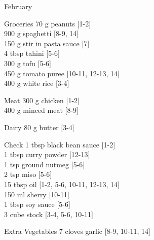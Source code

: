\begin{menu}{February}
\begin{shoppinglist}{Groceries}
      70 g peanuts 
        {\scriptsize[1-2]}\\
      900 g spaghetti 
        {\scriptsize[8-9, 14]}\\
      150 g stir in pasta sauce 
        {\scriptsize[7]}\\
      4 tbsp tahini 
        {\scriptsize[5-6]}\\
      300 g tofu 
        {\scriptsize[5-6]}\\
      450 g tomato puree 
        {\scriptsize[10-11, 12-13, 14]}\\
      400 g white rice 
        {\scriptsize[3-4]}\\
      \end{shoppinglist}%
      \par\vfil %
      \begin{shoppinglist}{Meat}
      300 g chicken 
        {\scriptsize[1-2]}\\
      400 g minced meat 
        {\scriptsize[8-9]}\\
      \end{shoppinglist}%
      \begin{shoppinglist}{Dairy}
      80 g butter 
        {\scriptsize[3-4]}\\
      \end{shoppinglist}%
      \par\vfil %
      \vfil\clearpage %
      \begin{shoppinglist}{Check}
      1 tbsp black bean sauce 
        {\scriptsize[1-2]}\\
      1 tbsp curry powder 
        {\scriptsize[12-13]}\\
      1 tsp ground nutmeg 
        {\scriptsize[5-6]}\\
      2 tsp miso 
        {\scriptsize[5-6]}\\
      15 tbsp oil 
        {\scriptsize[1-2, 5-6, 10-11, 12-13, 14]}\\
      150 ml sherry 
        {\scriptsize[10-11]}\\
      1 tbsp soy sauce 
        {\scriptsize[5-6]}\\
      3 cube stock 
        {\scriptsize[3-4, 5-6, 10-11]}\\
      \end{shoppinglist}%
      \begin{shoppinglist}{Extra Vegetables}
      7 cloves garlic 
        {\scriptsize[8-9, 10-11, 14]}\\

\end{shoppinglist}
\end{menu}
